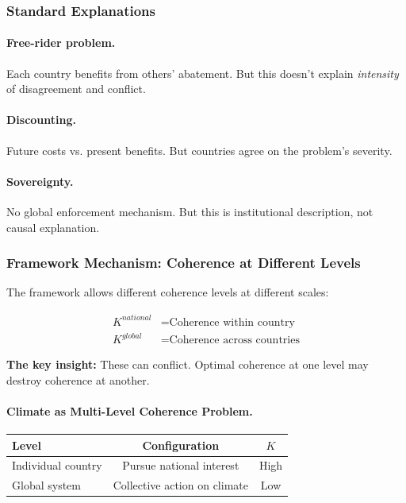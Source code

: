 \subsubsection{Standard Explanations}

\paragraph{Free-rider problem.} Each country benefits from others' abatement.
But this doesn't explain \emph{intensity} of disagreement and conflict.

\paragraph{Discounting.} Future costs vs. present benefits.
But countries agree on the problem's severity.

\paragraph{Sovereignty.} No global enforcement mechanism.
But this is institutional description, not causal explanation.

\subsubsection{Framework Mechanism: Coherence at Different Levels}

The framework allows different coherence levels at different scales:

\begin{align}
K^{national} &= \text{Coherence within country} \\
K^{global} &= \text{Coherence across countries}
\end{align}

\textbf{The key insight:} These can conflict. Optimal coherence at one level 
may destroy coherence at another.

\paragraph{Climate as Multi-Level Coherence Problem.}

\begin{center}
\renewcommand{\arraystretch}{1.3}
\begin{tabular}{lcc}
\hline
\textbf{Level} & \textbf{Configuration} & \textbf{$K$} \\
\hline
Individual country & Pursue national interest & High \\
Global system & Collective action on climate & Low \\
\hline
\end{tabular}
\end{center}

